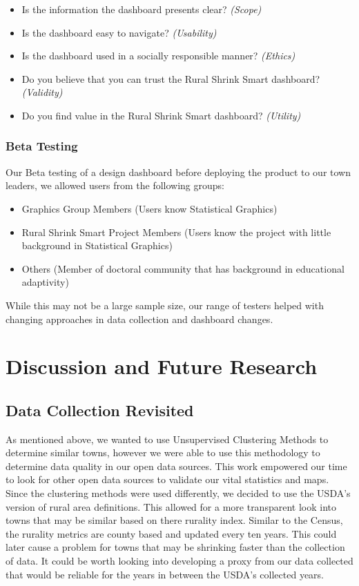 \documentclass[letterpaper,inpress]{jdsart}
\begin{document}
\begin{itemize}
\item Is the information the dashboard presents clear? \textit{(Scope)}
\item Is the dashboard easy to navigate? \textit{(Usability)}
\item Is the dashboard used in a socially responsible manner? \textit{(Ethics)}
\item Do you believe that you can trust the Rural Shrink Smart dashboard? \textit{(Validity)}
\item Do you find value in the Rural Shrink Smart dashboard? \textit{(Utility)}
\end{itemize}

\subsubsection{Beta Testing}

Our Beta testing of a design dashboard before deploying the product to our town leaders, we allowed users from the following groups:

\begin{itemize}
    \item Graphics Group Members (Users know Statistical Graphics)
    \item Rural Shrink Smart Project Members (Users know the project with little background in Statistical Graphics)
    \item  Others (Member of doctoral community that has background in educational adaptivity)
\end{itemize}

While this may not be a large sample size, our range of testers helped with changing approaches in data collection and dashboard changes.

\section{Discussion and Future Research}

\subsection{Data Collection Revisited}

As mentioned above, we wanted to use Unsupervised Clustering Methods to determine similar towns, however we were able to use this methodology to determine data quality in our open data sources. This work empowered our time to look for other open data sources to validate our vital statistics and maps. Since the clustering methods were used differently, we decided to use the USDA's version of rural area definitions. This allowed for a more transparent look into towns that may be similar based on there rurality index. Similar to the Census, the rurality metrics are county based and updated every ten years. This could later cause a problem for towns that may be shrinking faster than the collection of data. It could be worth looking into developing a proxy from our data collected that would be reliable for the years in between the USDA's collected years.
\end{document}
